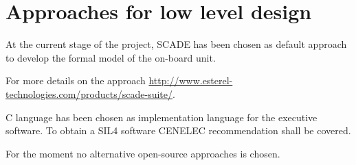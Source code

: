 
\section{Approaches for low level design}

At the current stage of the project, SCADE has been chosen as default approach to  develop the formal  model of the on-board unit.

For more details on the approach \url{http://www.esterel-technologies.com/products/scade-suite/}.


C language has been chosen as implementation language for the executive software. To obtain a SIL4 software CENELEC recommendation shall be covered.

For the moment no alternative open-source approaches is chosen.


